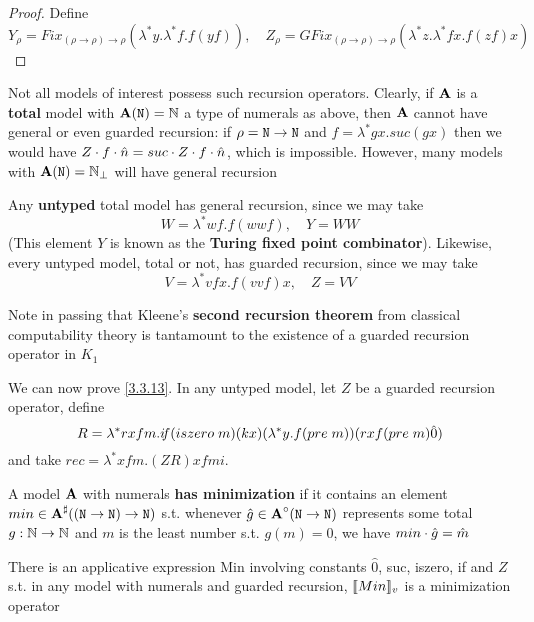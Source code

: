 \documentclass[11pt]{article}
\newcommand{\IF}{i\mspace{-4mu}f}
\begin{document}
\begin{proof}
Define
\begin{equation*}
Y_\rho=Fix_{(\rho\to\rho)\to\rho}(\lambda^*y.\lambda^*f.f(yf)),\quad Z_\rho=GFix_{(\rho\to\rho)\to\rho}(\lambda^*z.\lambda^*fx.f(zf)x)
\end{equation*}
\end{proof}

Not all models of interest possess such recursion operators. Clearly, if \(\operatorname{\textbf{A}}\) is a \textbf{total} model
with \(\operatorname{\textbf{A}}(\texttt{N})=\mathbb{N}\) a type of numerals as above, then \(\operatorname{\textbf{A}}\) cannot have general or even guarded
recursion: if \(\rho=\texttt{N}\to\texttt{N}\)  and \(f=\lambda^*gx.suc(gx)\) then we would
have \(Z\cdot f\cdot\hat{n}=suc\cdot Z\cdot f\cdot\hat{n}\), which is impossible. However, many models
with \(\operatorname{\textbf{A}}(\texttt{N})=\mathbb{N}_\bot\) will have general recursion

Any \textbf{untyped} total model has general recursion, since we may take
\begin{equation*}
W=\lambda^*wf.f(wwf),\quad Y=WW
\end{equation*}
(This element \(Y\) is known as the \textbf{Turing fixed point combinator}). Likewise, every untyped
model, total or not, has guarded recursion, since we may take
\begin{equation*}
V=\lambda^*vfx.f(vvf)x,\quad Z=VV
\end{equation*}

Note in passing that Kleene’s \textbf{second recursion theorem} from classical computability theory is
tantamount to the existence of a guarded recursion operator in \(K_1\)

We can now prove \ref{3.3.13}. In any untyped model, let \(Z\) be a guarded recursion operator,
define
\begin{equation*}
R=\lambda^*rxfm.\IF(iszero\;m)(kx)(\lambda^*y.f(pre\;m))(rxf(pre\; m)\hat{0})
\end{equation*}
and take \(rec=\lambda^*xfm.(ZR)xfmi\).

\begin{definition}[]
A model \(\operatorname{\textbf{A}}\) with numerals \textbf{has minimization} if it contains an
element \(min\in\operatorname{\textbf{A}}^\sharp((\texttt{N}\to\texttt{N})\to\texttt{N})\) s.t. whenever \(\hat{g}\in\operatorname{\textbf{A}}^\circ(\texttt{N}\to\texttt{N})\) represents some
total \(g:\mathbb{N}\to\mathbb{N}\) and \(m\) is the least number s.t. \(g(m)=0\), we have \(min\cdot\hat{g}=\hat{m}\)
\end{definition}

\begin{proposition}[]
\label{3.3.19}
There is an applicative expression Min involving constants \(\hat{0}\), suc, iszero, if
and \(Z\) s.t. in any model with numerals and guarded recursion, \(\llbracket Min \rrbracket_v\) is a
minimization operator
\end{proposition}
\end{document}

